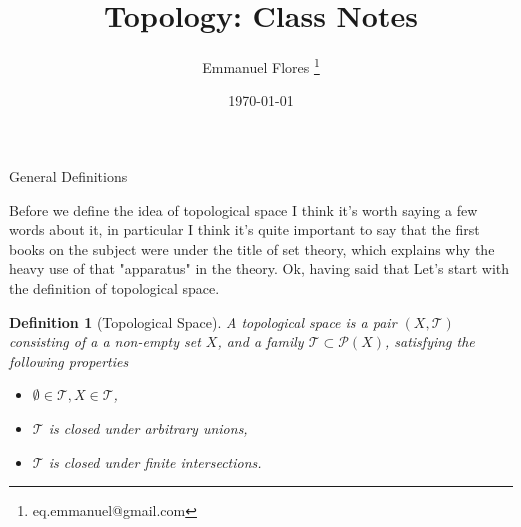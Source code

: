 \documentclass[12pt]{article}
\title{Topology: Class Notes}
\author{Emmanuel Flores \thanks{eq.emmanuel@gmail.com}}
\date{\today}
\newtheorem{definition}{Definition}[section]
\begin{document}
\maketitle
\begin{section}{General Definitions}

Before we define the idea of topological space I think it's worth saying a few words about it, in particular I think it's quite important to say that the first books on the subject were under the title of set theory, which explains why the heavy use of that "apparatus" in the theory. Ok, having said that Let's start with the definition of topological space.

\begin{tcolorbox}[title=Topological Space]
	\begin{definition}[Topological Space]
	 A topological space is a pair $(X,\mathcal{T})$ consisting of a a non-empty set $X$, and a family $\mathcal{T}\subset \mathcal{P}(X)$, satisfying the following properties \begin{itemize}
  			\item $\emptyset\in \mathcal{T},X\in \mathcal{T}$,
  			\item $\mathcal{T}$ is closed under arbitrary unions,
  			\item $\mathcal{T}$ is closed under finite intersections.
		\end{itemize}

	\end{definition}
\end{tcolorbox}
\end{section}

\end{document}
